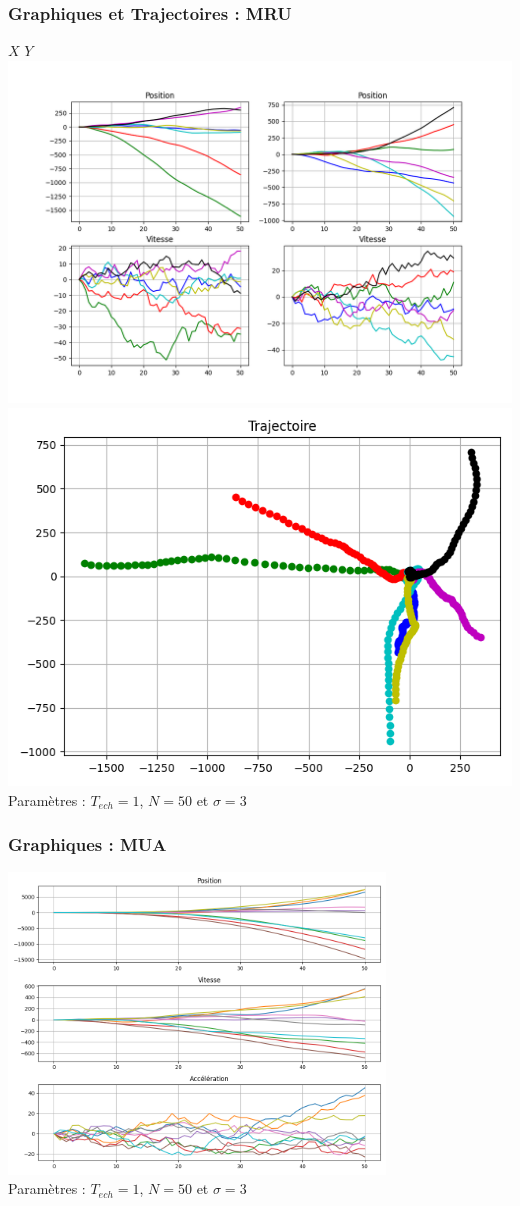 \documentclass{beamer}
\begin{document}
\begin{frame}
  \frametitle{Graphiques et Trajectoires : MRU}
  \hspace{1,7cm} $X$ \hspace{3cm} $Y$
  \includegraphics[width=.65\textwidth]{images/MRU_Générations.png}\hfill
  \includegraphics[width=.35\textwidth]{images/MRU_Trajectoires.png} 
  Paramètres : $T_{ech} = 1$, $N = 50$ et $\sigma = 3$
\end{frame}

\begin{frame}
  \frametitle{Graphiques : MUA}
  \includegraphics[width=0.75\textwidth]{images/MUA_Générations.png} \\
  Paramètres : $T_{ech} = 1$, $N = 50$ et $\sigma = 3$
\end{frame}
\end{document}
